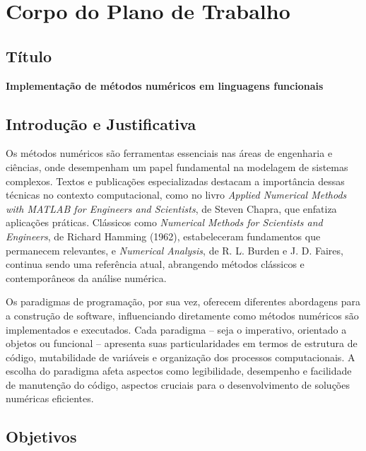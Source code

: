 \section*{Corpo do Plano de Trabalho}

\subsection*{Título}

\begin{center}
    \textbf{
    Implementação de métodos numéricos em linguagens funcionais
    }
\end{center}

\subsection*{Introdução e Justificativa}

Os métodos numéricos são ferramentas essenciais nas áreas de engenharia e
ciências, onde desempenham um papel fundamental na modelagem de sistemas
complexos. Textos e publicações especializadas destacam a importância dessas
técnicas no contexto computacional, como no livro
\textit{Applied Numerical Methods with MATLAB for Engineers and Scientists},
de Steven Chapra, que enfatiza aplicações práticas. Clássicos como
\textit{Numerical Methods for Scientists and Engineers}, de Richard Hamming
(1962), estabeleceram fundamentos que permanecem relevantes, e
\textit{Numerical Analysis}, de R. L. Burden e J. D. Faires, continua sendo
uma referência atual, abrangendo métodos clássicos e contemporâneos da análise
numérica.

Os paradigmas de programação, por sua vez, oferecem diferentes abordagens
para a construção de software, influenciando diretamente como métodos
numéricos são implementados e executados. Cada paradigma -- seja o
imperativo, orientado a objetos ou funcional -- apresenta suas particularidades
em termos de estrutura de código, mutabilidade de variáveis e organização dos
processos computacionais. A escolha do paradigma afeta aspectos como
legibilidade, desempenho e facilidade de manutenção do código, aspectos
cruciais para o desenvolvimento de soluções numéricas eficientes.

\subsection*{Objetivos}

